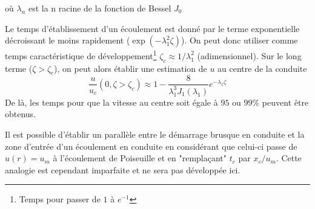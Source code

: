       où $\lambda_n$ est la n racine de la fonction de Bessel $J_0$
      \begin{figure}[!h]
        \centering
        
      \end{figure}
      Le temps d'établissement d'un écoulement est donné par le terme exponentielle décroissant le moins rapidement ($\exp(-\lambda_1^2 \zeta)$). On peut donc utiliser comme temps caractéristique de développement\footnote{Temps pour passer de $1$ à $e^{-1}$} $\zeta_c \approx 1/\lambda^2_1$ (adimensionnel). Sur le long terme ($\zeta > \zeta_c$), on peut alors établir une estimation de $u$ au centre de la conduite
      \begin{equation}
        \frac{u}{u_c}(0, \zeta>\zeta_c) \approx 1 - \frac{8}{\lambda_1^3 J_1(\lambda_1)}e^{-\lambda_1\zeta}
      \end{equation}
      De là, les temps pour que la vitesse au centre soit égale à $95$ ou $99\%$ peuvent être obtenus.

      Il est possible d'établir un parallèle entre le démarrage brusque en conduite et la zone d'entrée d'un écoulement en conduite en considérant que celui-ci passe de $u(r)= u_m$ à l'écoulement de Poiseuille et en "remplaçant" $t_c$ par $x_c/u_m$. Cette analogie est cependant imparfaite et ne sera pas développée ici.


